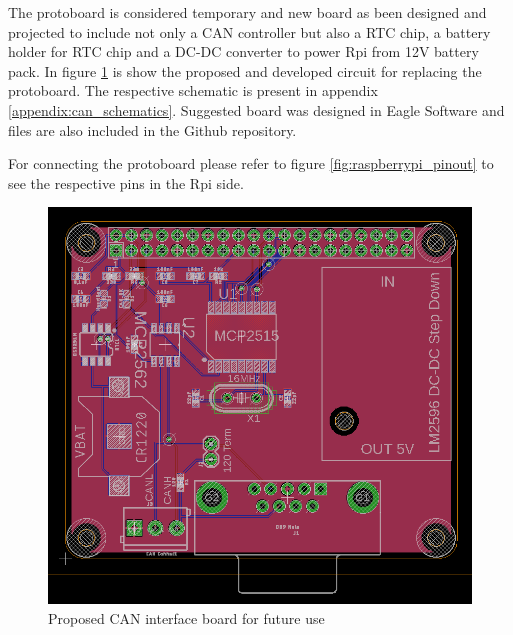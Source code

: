 The protoboard is considered temporary and new board as been designed and projected to include not only a \gls{CAN} controller but also a \gls{RTC} chip, a battery holder for \gls{RTC} chip and a DC-DC converter to power \gls{Rpi} from 12V battery pack. In figure \ref{fig:board_can} is show the proposed and developed circuit for replacing the protoboard. The respective schematic is present in appendix \ref{appendix:can_schematics}. Suggested board was designed in Eagle Software and files are also included in the Github repository.

For connecting the protoboard please refer to figure \ref{fig:raspberrypi_pinout} to see the respective pins in the \gls{Rpi} side.

\begin{figure}[!h]
	\centering
	\includegraphics[width=0.6\linewidth]{figures/Viena_Rpi_CAN_interface_board}
	\caption{Proposed CAN interface board for future use}
	\label{fig:board_can}
\end{figure}


